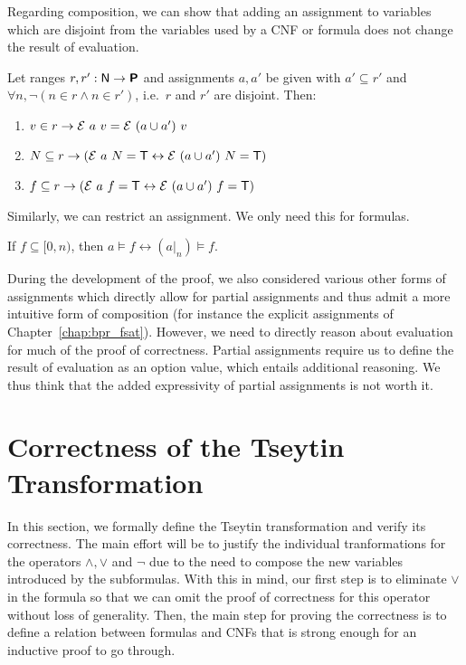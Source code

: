 Regarding composition, we can show that adding an assignment to variables which are disjoint from the variables used by a CNF or formula does not change the result of evaluation. 
\begin{proposition}\label{prop:eval_ext_assgn}
  Let ranges $r, r' : \mathsf{N} \rightarrow \textsf{\bfseries P}$ and assignments $a, a'$ be given with $a' \subseteq r'$ and $\forall n, \lnot (n \in r \land n \in r')$, i.e.\ $r$ and $r'$ are disjoint. Then:
  \begin{enumerate}
    \item $v \in r \rightarrow \mathcal{E}~a~v = \mathcal{E}~(a \cup a')~v$
    \item $N \subseteq r \rightarrow (\mathcal{E}~a~N = \mathsf{T} \leftrightarrow \mathcal{E}~(a \cup a')~N = \mathsf{T})$
    \item $f \subseteq r \rightarrow (\mathcal{E}~a~f = \mathsf{T} \leftrightarrow \mathcal{E}~(a \cup a')~f = \mathsf{T})$
  \end{enumerate}
\end{proposition}

Similarly, we can restrict an assignment. We only need this for formulas. 
\begin{proposition}\label{prop:eval_restrict}
  If $f \subseteq [0, n)$, then $a \models f \leftrightarrow (a|_n) \models f$.
\end{proposition}

\begin{remark}
  During the development of the proof, we also considered various other forms of assignments which directly allow for partial assignments and thus admit a more intuitive form of composition (for instance the explicit assignments of Chapter~\ref{chap:bpr_fsat}). 
  However, we need to directly reason about evaluation for much of the proof of correctness. Partial assignments require us to define the result of evaluation as an option value, which entails additional reasoning. 
  We thus think that the added expressivity of partial assignments is not worth it.
\end{remark}

\section{Correctness of the Tseytin Transformation}
In this section, we formally define the Tseytin transformation and verify its correctness. 
The main effort will be to justify the individual tranformations for the operators $\land, \lor$ and $\lnot$ due to the need to compose the new variables introduced by the subformulas. With this in mind, our first step is to eliminate $\lor$ in the formula so that we can omit the proof of correctness for this operator without loss of generality. Then, the main step for proving the correctness is to define a relation between formulas and CNFs that is strong enough for an inductive proof to go through.

